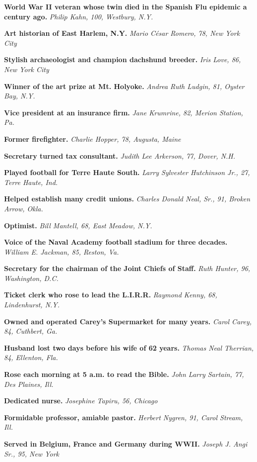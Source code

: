\textbf{World War II veteran whose twin died in the Spanish Flu epidemic
a century ago.} \emph{Philip Kahn, 100, Westbury, N.Y.}

\textbf{Art historian of East Harlem, N.Y.} \emph{Mario César Romero,
78, New York City}

\textbf{Stylish archaeologist and champion dachshund breeder.}
\emph{Iris Love, 86, New York City}

\textbf{Winner of the art prize at Mt. Holyoke.} \emph{Andrea Ruth
Ludgin, 81, Oyster Bay, N.Y.}

\textbf{Vice president at an insurance firm.} \emph{Jane Krumrine, 82,
Merion Station, Pa.}

\textbf{Former firefighter.} \emph{Charlie Hopper, 78, Augusta, Maine}

\textbf{Secretary turned tax consultant.} \emph{Judith Lee Arkerson, 77,
Dover, N.H.}

\textbf{Played football for Terre Haute South.} \emph{Larry Sylvester
Hutchinson Jr., 27, Terre Haute, Ind.}

\textbf{Helped establish many credit unions.} \emph{Charles Donald Neal,
Sr., 91, Broken Arrow, Okla.}

\textbf{Optimist.} \emph{Bill Mantell, 68, East Meadow, N.Y.}

\textbf{Voice of the Naval Academy football stadium for three decades.}
\emph{William E. Jackman, 85, Reston, Va.}

\textbf{Secretary for the chairman of the Joint Chiefs of Staff.}
\emph{Ruth Hunter, 96, Washington, D.C.}

\textbf{Ticket clerk who rose to lead the L.I.R.R.} \emph{Raymond Kenny,
68, Lindenhurst, N.Y.}

\textbf{Owned and operated Carey's Supermarket for many years.}
\emph{Carol Carey, 84, Cuthbert, Ga.}

\textbf{Husband lost two days before his wife of 62 years.} \emph{Thomas
Neal Therrian, 84, Ellenton, Fla.}

\textbf{Rose each morning at 5 a.m. to read the Bible.} \emph{John Larry
Sartain, 77, Des Plaines, Ill.}

\textbf{Dedicated nurse.} \emph{Josephine Tapiru, 56, Chicago}

\textbf{Formidable professor, amiable pastor.} \emph{Herbert Nygren, 91,
Carol Stream, Ill.}

\textbf{Served in Belgium, France and Germany during WWII.} \emph{Joseph
J. Angi Sr., 95, New York}

